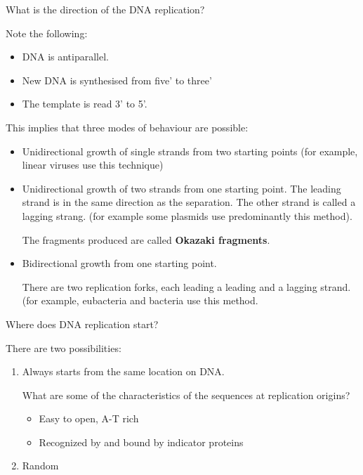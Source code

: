 \documentclass[11pt]{scrartcl}
\begin{document}
\begin{ques*}

What is the direction of the DNA replication?

\end{ques*}
Note the following:
\begin{itemize}
\item DNA is antiparallel.
\item New DNA is synthesised from five' to three'
\item The template is read 3' to 5'.
\end{itemize}
This implies that three modes of behaviour are possible:
\begin{itemize}
\item Unidirectional growth of single strands from two starting
  points (for example, linear viruses use this technique)
\item Unidirectional growth of two strands from one starting
  point. The leading strand is in the same direction as the
  separation. The other strand is called a lagging strang. (for
  example some plasmids use predominantly this method).

  The fragments produced are called \textbf{Okazaki fragments}.
\item Bidirectional growth from one starting point.

  There are two replication forks, each leading a leading and a
  lagging strand. (for example, eubacteria and bacteria use this
  method.

\end{itemize}
  \begin{ques*}

    Where does DNA replication start?

  \end{ques*}

  There are two possibilities:


\begin{enumerate}
\item\label{item:1} Always starts from the same location on DNA.

  What
  are some of the characteristics of the sequences at replication
  origins?
\begin{itemize}
\item Easy to open, A-T rich
\item Recognized by and bound by indicator proteins
\end{itemize}
\item Random
\end{enumerate}
\end{document}
